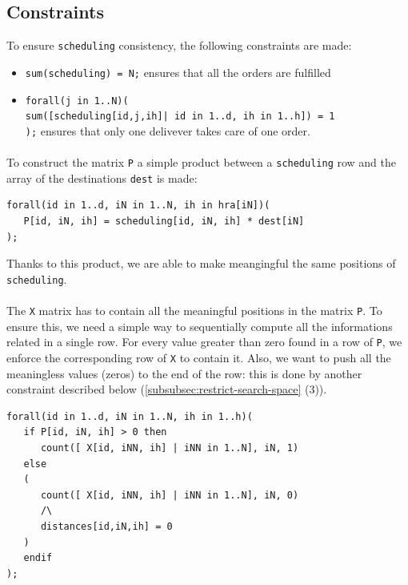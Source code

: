 \documentclass[10pt]{article}
\begin{document}
	\subsection{Constraints}

	To ensure \texttt{scheduling} consistency, the following constraints are made:
	\begin{itemize}
		\item \texttt{sum(scheduling) = N;} ensures that all the orders are fulfilled %
		\item \texttt{forall(j in 1..N)(\\
			sum([scheduling[id,j,ih]| id in 1..d, ih in 1..h]) = 1\\
		  );} ensures that only one delivever takes care of one order. 
	\end{itemize}

	\paragraph*{}
	To construct the matrix \texttt{P} a simple product between a \texttt{scheduling} row and the array of the destinations \texttt{dest} is
	made:
	\begin{verbatim}
forall(id in 1..d, iN in 1..N, ih in hra[iN])(
   P[id, iN, ih] = scheduling[id, iN, ih] * dest[iN]
);
	\end{verbatim}
	
	Thanks to this product, we are able to make meangingful the same positions
	of \texttt{scheduling}.

	\paragraph*{}
	The \texttt{X} matrix has to contain all the meaningful	positions in the matrix
	\texttt{P}. To ensure this, we need a simple way to sequentially compute all the
	informations related in a single row. For every value greater than zero found in a row 
	of \texttt{P}, we enforce the corresponding row of \texttt{X} to contain it. 
	Also, we want to push all the meaningless values (zeros) to the end of the row: this is done
	by another constraint described below (\cref{subsubsec:restrict-search-space} (3)).	

	\begin{verbatim}
forall(id in 1..d, iN in 1..N, ih in 1..h)(
   if P[id, iN, ih] > 0 then 
      count([ X[id, iNN, ih] | iNN in 1..N], iN, 1)
   else
   (
      count([ X[id, iNN, ih] | iNN in 1..N], iN, 0) 
      /\
      distances[id,iN,ih] = 0
   )
   endif
);
	\end{verbatim}
\end{document}
